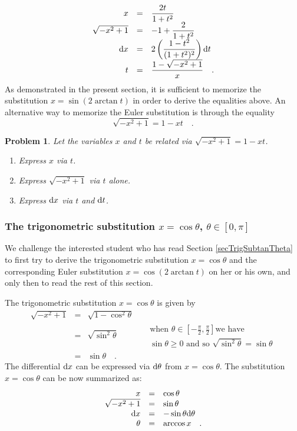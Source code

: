 \documentclass[12pt]{book}
\newtheorem{problem}[theorem]{Problem}
\begin{document}
\[
\begin{array}{rcl}
x&=&\displaystyle \frac{2t}{1+t^2}\\
\sqrt{-x^2+1}&=&\displaystyle -1+\frac{2}{1+t^2}  \\
{\normalfont \text{d}} x&=&\displaystyle  2\left(\frac{1-t^2 }{(1+ t^2)^2} \right) {\normalfont \text{d}} t\\
t&=&\displaystyle \frac{ 1-\sqrt{-x^2+1}}{x} \quad .
\end{array}
\]
As demonstrated in the present section, it is sufficient to memorize the substitution $x=\sin (2\arctan t)$ in order to derive the equalities above. An alternative way to memorize the Euler substitution is through the equality
\[
\sqrt{-x^2+1}=1-xt\quad .
\]
\begin{problem}
 Let the variables $x$ and $t$ be related via $\sqrt{-x^2+1}=1-xt$.
\begin{enumerate}
\item Express $x$ via $t$.
\item Express $\sqrt{-x^2+1}$ via $t$ alone.
\item Express ${\normalfont \text{d}} x$ via $t$ and ${\normalfont \text{d}} t$.
\end{enumerate}
\end{problem}

\subsubsection{The trigonometric substitution $x=\cos \theta$, $\theta\in\left[0, \pi\right] $}
We challenge the interested student who has read Section \ref{secTrigSubtanTheta} to first try to derive the trigonometric substitution $x=\cos \theta$ and the corresponding Euler substitution $x=\cos (2\arctan t)$  on her or his own, and only then to read the rest of this section.

The trigonometric substitution $x=\cos \theta$ is given by
\[
\begin{array}{rcll|l}
\displaystyle \sqrt{-x^2+1}&=&\displaystyle \sqrt{1-\cos^2\theta}\\
&=&\displaystyle \sqrt{\sin^2\theta} &&\begin{array}{l} \text{when }\theta\in\left[-\frac{\pi}{2}, \frac{\pi}{2} \right] \text{we have}\\
\sin \theta\geq 0 \text{ and so } \sqrt{\sin^2\theta}=\sin \theta
\end{array} \\
&=&\displaystyle \sin \theta\quad .
\end{array}
\]
The differential ${\normalfont \text{d}} x$ can be expressed via ${\normalfont \text{d}} \theta$ from $x=\cos \theta$. The substitution $x=\cos \theta $ can be now summarized as:
\begin{equation*}
\begin{array}{rcl}
x&=&\cos \theta\\
\sqrt{-x^2+1}&=&\sin \theta\\
{\normalfont \text{d}} x&=& -\sin \theta {\normalfont \text{d}} \theta\\
\theta&=&\arccos x \quad .
\end{array}
\end{equation*}
\end{document}
